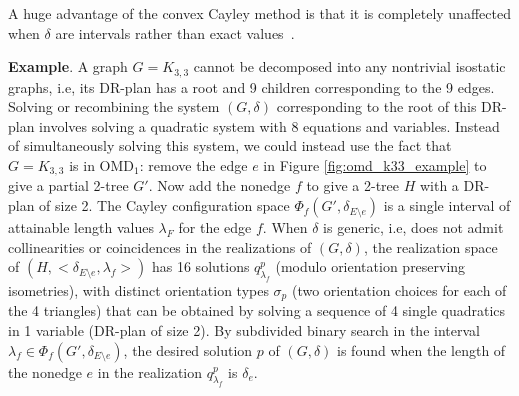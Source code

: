 \noindent
\note A huge advantage of the convex Cayley method is that it is
completely unaffected when $\delta$ are intervals rather than exact
values~\cite{GaoSitharam}.



\medskip\noindent
\textbf{Example}. 
A graph $G=K_{3,3}$  cannot be decomposed into any nontrivial
isostatic graphs, i.e, its DR-plan has a root and 9 children
corresponding to the 9 edges. Solving or recombining the system
$(G,\delta)$ corresponding to the root of this DR-plan involves
solving a quadratic system with 8 equations and variables. Instead of
simultaneously solving this system, we could instead use the fact that
$G=K_{3,3}$ is in OMD$_1$: remove the edge $e$ in Figure
\ref{fig:omd_k33_example} to give a partial 2-tree $G'$. Now add the
nonedge $f$ to give a 2-tree $H$ with a DR-plan of size 2. The Cayley
configuration space $\Phi_f(G', \delta_{E\setminus e})$ is a single
interval of attainable length values $\lambda_F$ for the edge $f$.
When $\delta$ is generic, i.e, does not admit collinearities or
coincidences in the realizations of $(G,\delta)$, the realization
space of $(H, <\delta_{E\setminus e}, \lambda_f>)$ has 16 solutions
$q^p_{\lambda_f}$ (modulo orientation preserving isometries), with
distinct orientation types $\sigma_p$ (two orientation choices for
each of the 4 triangles) that can be obtained by solving a sequence of
4 single quadratics in 1 variable (DR-plan of size 2). By subdivided
binary search in the interval $\lambda_f \in \Phi_f(G',
\delta_{E\setminus e})$, the desired solution $p$  of $(G,\delta)$ is
found when the length of the nonedge $e$ in  the realization
$q^p_{\lambda_f}$ is $\delta_e$.
%
